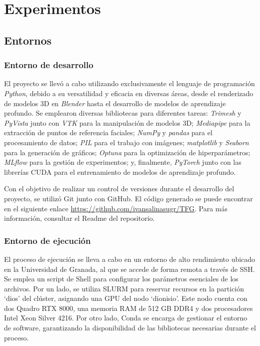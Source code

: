 \chapter{Experimentos}
\thispagestyle{empty}

\section{Entornos}

\subsection{Entorno de desarrollo}

El proyecto se llevó a cabo utilizando exclusivamente el lenguaje de programación \textit{Python}, debido a su versatilidad y eficacia en diversas áreas, desde el renderizado de modelos 3D en \textit{Blender} hasta el desarrollo de modelos de aprendizaje profundo. Se emplearon diversas bibliotecas para diferentes tareas: \textit{Trimesh} y \textit{PyVista} junto con \textit{VTK} para la manipulación de modelos 3D; \textit{Mediapipe} para la extracción de puntos de referencia faciales; \textit{NumPy} y \textit{pandas} para el procesamiento de datos; \textit{PIL} para el trabajo con imágenes; \textit{matplotlib} y \textit{Seaborn} para la generación de gráficos; \textit{Optuna} para la optimización de hiperparámetros; \textit{MLflow} para la gestión de experimentos; y, finalmente, \textit{PyTorch} junto con las librerías CUDA para el entrenamiento de modelos de aprendizaje profundo.

Con el objetivo de realizar un control de versiones durante el desarrollo del proyecto, se utilizó Git junto con GitHub. El código generado se puede encontrar en el siguiente enlace \url{https://github.com/ivansalinasugr/TFG}. Para más información, consultar el Readme del repositorio.

\subsection{Entorno de ejecución}

El proceso de ejecución se lleva a cabo en un entorno de alto rendimiento ubicado en la Universidad de Granada, al que se accede de forma remota a través de SSH. Se emplea un script de Shell para configurar los parámetros esenciales de los archivos. Por un lado, se utiliza SLURM para reservar recursos en la partición \enquote*{dios} del clúster, asignando una GPU del nodo \enquote*{dionisio}. Este nodo cuenta con dos Quadro RTX 8000, una memoria RAM de 512 GB DDR4 y dos procesadores Intel Xeon Silver 4216. Por otro lado, Conda se encarga de gestionar el entorno de software, garantizando la disponibilidad de las bibliotecas necesarias durante el proceso.

